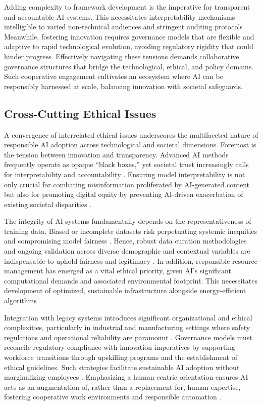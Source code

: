 \documentclass[sigconf]{acmart}
\begin{document}
Adding complexity to framework development is the imperative for transparent and accountable AI systems. This necessitates interpretability mechanisms intelligible to varied non-technical audiences and stringent auditing protocols \cite{ref36}. Meanwhile, fostering innovation requires governance models that are flexible and adaptive to rapid technological evolution, avoiding regulatory rigidity that could hinder progress. Effectively navigating these tensions demands collaborative governance structures that bridge the technological, ethical, and policy domains. Such cooperative engagement cultivates an ecosystem where AI can be responsibly harnessed at scale, balancing innovation with societal safeguards.

\subsection{Cross-Cutting Ethical Issues}

A convergence of interrelated ethical issues underscores the multifaceted nature of responsible AI adoption across technological and societal dimensions. Foremost is the tension between innovation and transparency. Advanced AI methods frequently operate as opaque “black boxes,” yet societal trust increasingly calls for interpretability and accountability \cite{ref7,ref8}. Ensuring model interpretability is not only crucial for combating misinformation proliferated by AI-generated content but also for promoting digital equity by preventing AI-driven exacerbation of existing societal disparities \cite{ref6,ref17}.

The integrity of AI systems fundamentally depends on the representativeness of training data. Biased or incomplete datasets risk perpetuating systemic inequities and compromising model fairness \cite{ref37}. Hence, robust data curation methodologies and ongoing validation across diverse demographic and contextual variables are indispensable to uphold fairness and legitimacy \cite{ref20}. In addition, responsible resource management has emerged as a vital ethical priority, given AI’s significant computational demands and associated environmental footprint. This necessitates development of optimized, sustainable infrastructure alongside energy-efficient algorithms \cite{ref19}.

Integration with legacy systems introduces significant organizational and ethical complexities, particularly in industrial and manufacturing settings where safety regulations and operational reliability are paramount \cite{ref38}. Governance models must reconcile regulatory compliance with innovation imperatives by supporting workforce transitions through upskilling programs and the establishment of ethical guidelines. Such strategies facilitate sustainable AI adoption without marginalizing employees \cite{ref11,ref12}. Emphasizing a human-centric orientation ensures AI acts as an augmentation of, rather than a replacement for, human expertise, fostering cooperative work environments and responsible automation \cite{ref2}.
\end{document}
